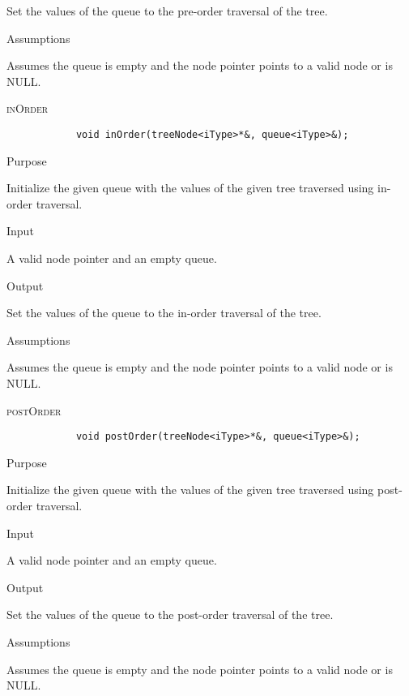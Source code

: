 \documentclass[pdftex, 12pt]{article}
\begin{document}
\begin{description}
\begin{description}
				Set the values of the queue to the pre-order traversal of the tree.

			\item{Assumptions}

				Assumes the queue is empty and the node pointer points to a valid node or is NULL.

		\end{description}
	\item{\textsc{inOrder}}
		\begin{lstlisting}
			void inOrder(treeNode<iType>*&, queue<iType>&);
		\end{lstlisting}
		\begin{description}

		\item{Purpose}
			
			Initialize the given queue with the values of the given tree traversed using in-order traversal.

		\item{Input}

			A valid node pointer and an empty queue.

		\item{Output}

			Set the values of the queue to the in-order traversal of the tree.

		\item{Assumptions}

			Assumes the queue is empty and the node pointer points to a valid node or is NULL.

		\end{description}
	\item{\textsc{postOrder}}
		\begin{lstlisting}
			void postOrder(treeNode<iType>*&, queue<iType>&);
		\end{lstlisting}
		\begin{description}

		\item{Purpose}
			
			Initialize the given queue with the values of the given tree traversed using post-order traversal.

		\item{Input}

			A valid node pointer and an empty queue.

		\item{Output}

			Set the values of the queue to the post-order traversal of the tree.

		\item{Assumptions}

			Assumes the queue is empty and the node pointer points to a valid node or is NULL.

		\end{description}

\end{description}
\end{document}

